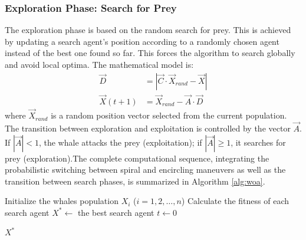 \subsubsection{Exploration Phase: Search for Prey}
The exploration phase is based on the random search for prey. This is achieved by updating a search agent's position according to a randomly chosen agent instead of the best one found so far. This forces the algorithm to search globally and avoid local optima. The mathematical model is:
\begin{align}
    \vec{D} &= |\vec{C} \cdot \vec{X}_{rand} - \vec{X}| \\
    \vec{X}(t+1) &= \vec{X}_{rand} - \vec{A} \cdot \vec{D}
\end{align}
where $\vec{X}_{rand}$ is a random position vector selected from the current population. The transition between exploration and exploitation is controlled by the vector $\vec{A}$. If $|\vec{A}| < 1$, the whale attacks the prey (exploitation); if $|\vec{A}| \ge 1$, it searches for prey (exploration).The complete computational sequence, integrating the probabilistic switching between spiral and encircling maneuvers as well as the transition between search phases, is summarized in Algorithm \ref{alg:woa}.

\begin{algorithm}[H]
\SetAlgoLined
\caption{Whale Optimization Algorithm (WOA)}
\label{alg:woa}

Initialize the whales population $X_i$ ($i = 1, 2, \dots, n$)\;
Calculate the fitness of each search agent\;
$X^* \leftarrow$ the best search agent\;
$t \leftarrow 0$\;

\Return $X^*$\;
\end{algorithm}

